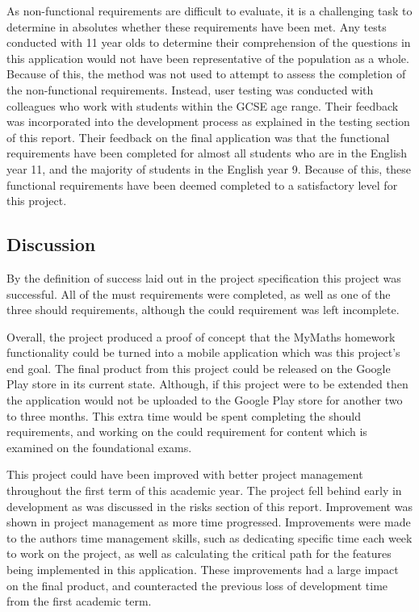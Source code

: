 \documentclass{article}
\begin{document}
As non-functional requirements are difficult to evaluate, it is a challenging task to determine in absolutes whether these requirements have been met. Any tests conducted with 11 year olds to determine their comprehension of the questions in this application would not have been representative of the population as a whole. Because of this, the method was not used to attempt to assess the completion of the non-functional requirements. Instead, user testing was conducted with colleagues who work with students within the GCSE age range. Their feedback was incorporated into the development process as explained in the testing section of this report. Their feedback on the final application was that the functional requirements have been completed for almost all students who are in the English year 11, and the majority of students in the English year 9. Because of this, these functional requirements have been deemed completed to a satisfactory level for this project. \par

\subsection{Discussion}

By the definition of success laid out in the project specification this project was successful. All of the must requirements were completed, as well as one of the three should requirements, although the could requirement was left incomplete. \par

Overall, the project produced a proof of concept that the MyMaths homework functionality could be turned into a mobile application which was this project's end goal. The final product from this project could be released on the Google Play store in its current state. Although, if this project were to be extended then the application would not be uploaded to the Google Play store for another two to three months. This extra time would be spent completing the should requirements, and working on the could requirement for content which is examined on the foundational exams. \par

This project could have been improved with better project management throughout the first term of this academic year. The project fell behind early in development as was discussed in the risks section of this report. Improvement was shown in project management as more time progressed. Improvements were made to the authors time management skills, such as dedicating specific time each week to work on the project, as well as calculating the critical path for the features being implemented in this application. These improvements had a large impact on the final product, and counteracted the previous loss of development time from the first academic term. \par
\end{document}
